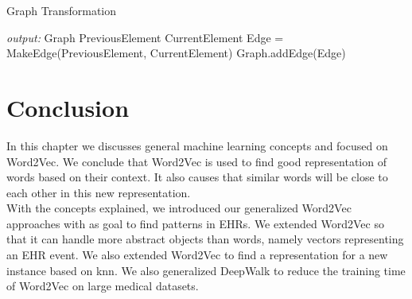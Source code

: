 \begin{algorithm}
\label{alg:graphTrans}
\caption{Graph Transformation}
\begin{algorithmic}[1]

\State \textit{output: } Graph
		\State PreviousElement
		\State CurrentElement
		\State Edge = MakeEdge(PreviousElement, CurrentElement)
		\State Graph.addEdge(Edge)
	\EndFor
\EndFor

\end{algorithmic}
\end{algorithm}

\section{Conclusion}
In this chapter we discusses general machine learning concepts and focused on Word2Vec. We conclude that Word2Vec is used to find good representation of words based on their context. It also causes that similar words will be close to each other in this new representation. \\

With the concepts explained, we introduced our generalized Word2Vec approaches with as goal to find patterns in EHRs. We extended Word2Vec so that it can handle more abstract objects than words, namely vectors representing an EHR event. We also extended Word2Vec to find a representation for a new instance based on knn. We also generalized DeepWalk to reduce the training time of Word2Vec on large medical datasets.



